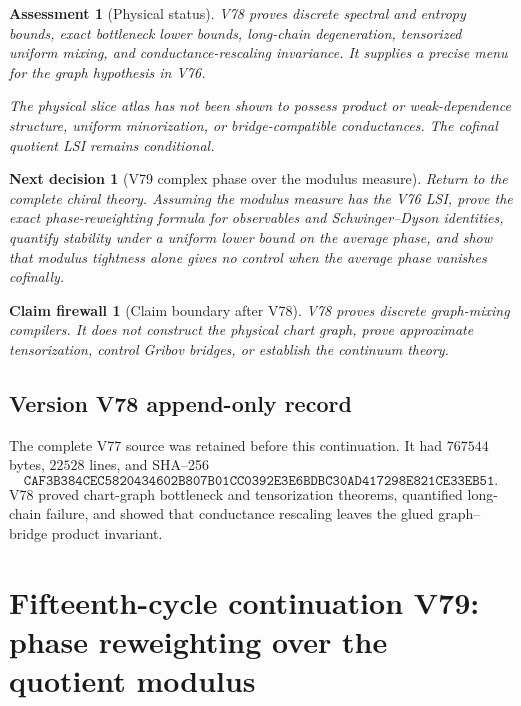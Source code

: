 \documentclass[11pt]{article}
\newtheorem{firewall}[theorem]{Claim firewall}
\newtheorem{decision}[theorem]{Next decision}
\newtheorem{assessment}[theorem]{Assessment}
\theoremstyle{remark}
\begin{document}
\begin{assessment}[Physical status]
\label{ass:v15v78-status}
V78 proves discrete spectral and entropy bounds, exact bottleneck
lower bounds, long-chain degeneration, tensorized uniform mixing,
and conductance-rescaling invariance.  It supplies a precise menu
for the graph hypothesis in V76.

The physical slice atlas has not been shown to possess product or
weak-dependence structure, uniform minorization, or bridge-compatible
conductances.  The cofinal quotient LSI remains conditional.
\end{assessment}

\begin{decision}[V79 complex phase over the modulus measure]
\label{dec:v15v78-next}
Return to the complete chiral theory.  Assuming the modulus
measure has the V76 LSI, prove the exact phase-reweighting formula
for observables and Schwinger--Dyson identities, quantify stability
under a uniform lower bound on the average phase, and show that
modulus tightness alone gives no control when the average phase
vanishes cofinally.
\end{decision}

\begin{firewall}[Claim boundary after V78]
\label{fire:v15v78}
V78 proves discrete graph-mixing compilers.  It does not construct
the physical chart graph, prove approximate tensorization, control
Gribov bridges, or establish the continuum theory.
\end{firewall}

\section*{Version V78 append-only record}
The complete V77 source was retained before this continuation.  It
had \(767544\) bytes, \(22528\) lines, and SHA--256
\[
 \texttt{CAF3B384CEC5820434602B807B01CC0392E3E6BDBC30AD417298E821CE33EB51}.
\]
V78 proved chart-graph bottleneck and tensorization theorems,
quantified long-chain failure, and showed that conductance
rescaling leaves the glued graph--bridge product invariant.

\chapter{Fifteenth-cycle continuation V79: phase reweighting over the quotient modulus}
\label{sec:v15v79}
\end{document}

